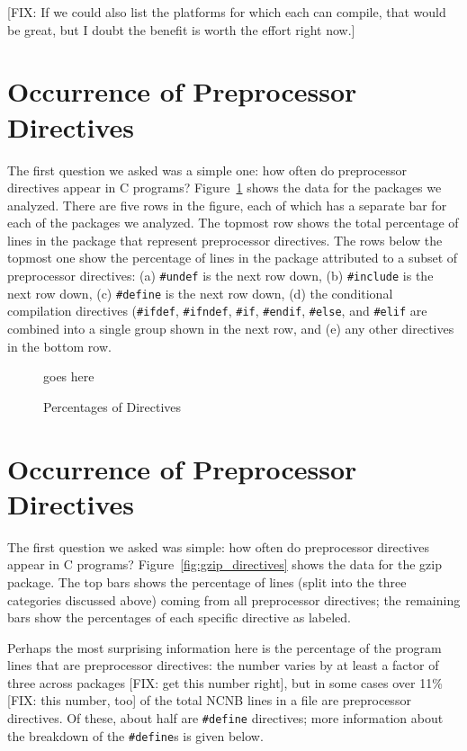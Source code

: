 [FIX: If we could also list the platforms for which each can compile,
that would be great, but I doubt the benefit is worth the effort right
now.]

\section{Occurrence of Preprocessor Directives}\label{sec:directives}

The first question we asked was a simple one: how often do
preprocessor directives appear in C programs?
Figure~\ref{fig:directives} shows the data for the packages we
analyzed.  There are five rows in the figure, each of which has a
separate bar for each of the packages we analyzed.  The topmost row
shows the total percentage of lines in the package that represent
preprocessor directives.  The rows below the topmost one show the
percentage of lines in the package attributed to a subset of
preprocessor directives: (a) \verb+#undef+ is the next row down, (b)
\verb+#include+ is the next row down, (c) \verb+#define+ is the next
row down, (d) the conditional compilation directives (\verb+#ifdef+,
\verb+#ifndef+, \verb+#if+, \verb+#endif+, \verb+#else+, and
\verb+#elif+ are combined into a single group shown in the next row,
and (e) any other directives in the bottom row. 

\begin{figure}
goes here

\caption{Percentages of Directives\label{fig:directives}}
\end{figure}

\section{Occurrence of Preprocessor Directives}\label{sec:directives}

The first question we asked was simple: how often do preprocessor
directives appear in C programs?  Figure~\ref{fig:gzip_directives} shows
the data for the gzip package.  The top bars shows the percentage of
lines (split into the three categories discussed above) coming from all
preprocessor directives; the remaining bars show the percentages of each
specific directive as labeled. 

Perhaps the most surprising information here is the percentage of the
program lines that are preprocessor directives: the number varies by
at least a factor of three across packages [FIX: get this number
right], but in some cases over 11\% [FIX: this number, too] of the
total NCNB lines in a file are preprocessor directives.  Of these,
about half are \verb+#define+ directives; more information about the
breakdown of the \verb+#define+s is given below.

